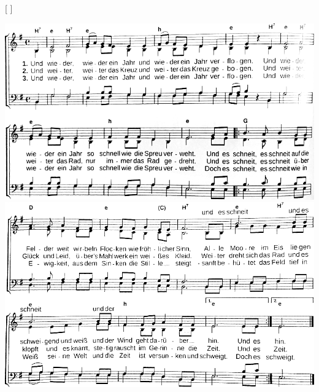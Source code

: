 [
]

\includegraphics[width=\textwidth, page=1, draft=false]{Noten/KrabatsMuehlenlied1}
\includegraphics[width=\textwidth, page=1, draft=false]{Noten/KrabatsMuehlenlied2}

\endsong
